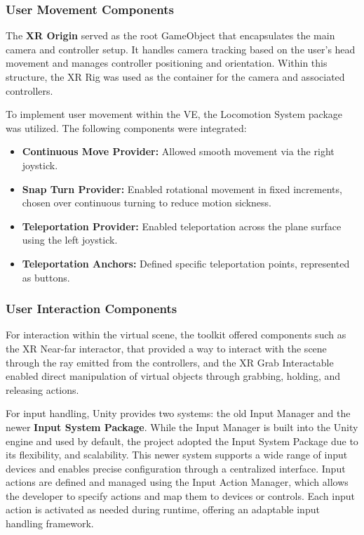 \subsubsection{User Movement Components}
The \textbf{XR Origin} served as the root GameObject that encapsulates the main camera and controller setup. 
It handles camera tracking based on the user's head movement and manages controller positioning and orientation. 
Within this structure, the XR Rig was used as the container for the camera and associated controllers.

To implement user movement within the \gls{VE}, the Locomotion System package was utilized. The following components were integrated: 

\begin{itemize}
\item{\textbf{Continuous Move Provider:}  Allowed smooth movement via the right joystick.}
\item{\textbf{Snap Turn Provider:}  Enabled rotational movement in fixed increments, chosen over continuous turning to reduce motion sickness.}
\item{\textbf{Teleportation Provider:} Enabled teleportation across the plane surface using the left joystick.}
\item{\textbf{Teleportation Anchors:} Defined specific teleportation points, represented as buttons.}
\end{itemize}

\subsubsection{User Interaction Components}
For interaction within the virtual scene, the toolkit offered components such as the XR Near-far interactor, that provided a way to interact with the scene through the ray emitted from the controllers, and the XR Grab Interactable enabled direct manipulation of virtual objects through grabbing, holding, and releasing actions.

For input handling, Unity provides two systems: the old Input Manager and the newer \textbf{Input System Package}. 
While the Input Manager is built into the Unity engine and used by default, the project adopted the Input System Package due to its flexibility, and scalability. 
This newer system supports a wide range of input devices and enables precise configuration through a centralized interface. Input actions are defined and managed using the Input Action Manager, which allows the developer to specify actions and map them to devices or controls. 
Each input action is activated as needed during runtime, offering an adaptable input handling framework.


